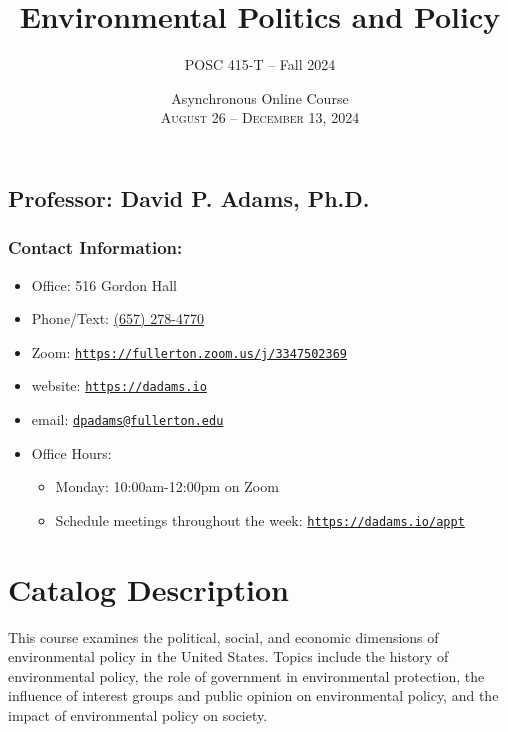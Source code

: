 \documentclass[12pt, letterpaper]{article}
\begin{document}
\title{\textbf{Environmental Politics and Policy}}

\author{POSC 415-T -- Fall 2024}
\date{Asynchronous Online Course \\ \textsc{August 26 -- December 13, 2024}}

    \maketitle


\subsection*{Professor: David P. Adams, Ph.D.}

\subsubsection*{Contact Information:}

\begin{itemize}
	\item Office: 516 Gordon Hall
	\item Phone/Text: \href{tel:+16572784770}{(657) 278-4770}
	\item Zoom: \href{https://fullerton.zoom.us/j/3347502369}{\texttt{https://fullerton.zoom.us/j/3347502369}}
	\item website: \href{https://dadams.io}{\texttt{https://dadams.io}}
	\item email: \href{dpadams@fullerton.edu}{\texttt{dpadams@fullerton.edu}}
	\item Office Hours:
        \begin{itemize}
            \item Monday: 10:00am-12:00pm on Zoom
            \item Schedule meetings throughout the week: \href{https://dadams.io/appt}{\texttt{https://dadams.io/appt}}
        \end{itemize}
            
\end{itemize}



\section*{Catalog Description}

This course examines the political, social, and economic dimensions of environmental policy in the United States. Topics include the history of environmental policy, the role of government in environmental protection, the influence of interest groups and public opinion on environmental policy, and the impact of environmental policy on society.
\end{document}
